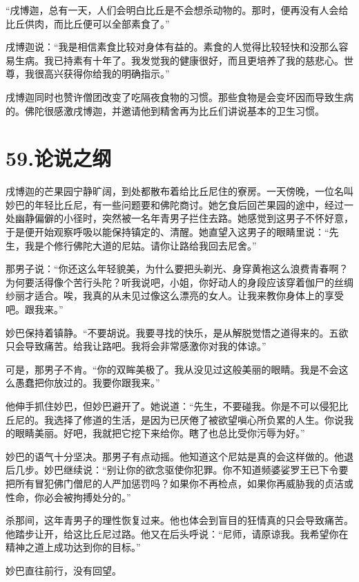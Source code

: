 \documentclass[12pt,twoside,openany]{book}
\begin{document}
“戌博迦，总有一天，人们会明白比丘是不会想杀动物的。那时，便再没有人会给比丘供肉，而比丘便可以全部素食了。”

戌博迦说：“我是相信素食比较对身体有益的。素食的人觉得比较轻快和没那么容易生病。我已持素有十年了。我发觉我的健康很好，而且更培养了我的慈悲心。世尊，我很高兴获得你给我的明确指示。”

戌博迦同时也赞许僧团改变了吃隔夜食物的习惯。那些食物是会变坏因而导致生病的。佛陀很感激戌博迦，并邀请他到精舍再为比丘们讲说基本的卫生习惯。


\chapter{59.论说之纲}\label{ch59}

戌博迦的芒果园宁静旷阔，到处都散布着给比丘尼住的寮房。一天傍晚，一位名叫妙巴的年轻比丘尼，有一些问题要和佛陀商讨。她乞食后回芒果园的途中，经过一处幽静偏僻的小径时，突然被一名年青男子拦住去路。她感觉到这男子不怀好意，于是便开始观察呼吸以能保持镇定的、清醒。她直望入这男子的眼睛里说：“先生，我是个修行佛陀大道的尼姑。请你让路给我回去尼舍。”

那男子说：“你还这么年轻貌美，为什么要把头剃光、身穿黄袍这么浪费青春啊？为何要活得像个苦行头陀？听我说吧，小姐，你好动人的身段应该穿着伽尸的丝绸纱丽才适合。唉，我真的从未见过像这么漂亮的女人。让我来教你身体上的享受吧。跟我来。”

妙巴保持着镇静。“不要胡说。我要寻找的快乐，是从解脱觉悟之道得来的。五欲只会导致痛苦。给我让路吧。我将会非常感激你对我的体谅。”

可是，那男子不肯。“你的双眸美极了。我从没见过这般美丽的眼睛。我是不会这么愚蠢把你放过的。我要你跟我来。”

他伸手抓住妙巴，但妙巴避开了。她说道：“先生，不要碰我。你是不可以侵犯比丘尼的。我选择了修道的生活，是因为已厌倦了被欲望嗔心所负累的人生。你说我的眼睛美丽。好吧，我就把它挖下来给你。瞎了也总比受你污辱为好。”

妙巴的语气十分坚决。那男子有点动摇。他知道这个尼姑是真的会这样做的。他退后几步。妙巴继续说：“别让你的欲念驱使你犯罪。你不知道频婆娑罗王已下令要把所有冒犯佛门僧尼的人严加惩罚吗？如果你不再检点，如果你再威胁我的贞洁或性命，你必会被拘搏处分的。”

杀那间，这年青男子的理性恢复过来。他也体会到盲目的狂情真的只会导致痛苦。他踏步让开，给这比丘尼过路。他又在后头呼说：“尼师，请原谅我。我希望你在精神之道上成功达到你的目标。”

妙巴直往前行，没有回望。
\end{document}
